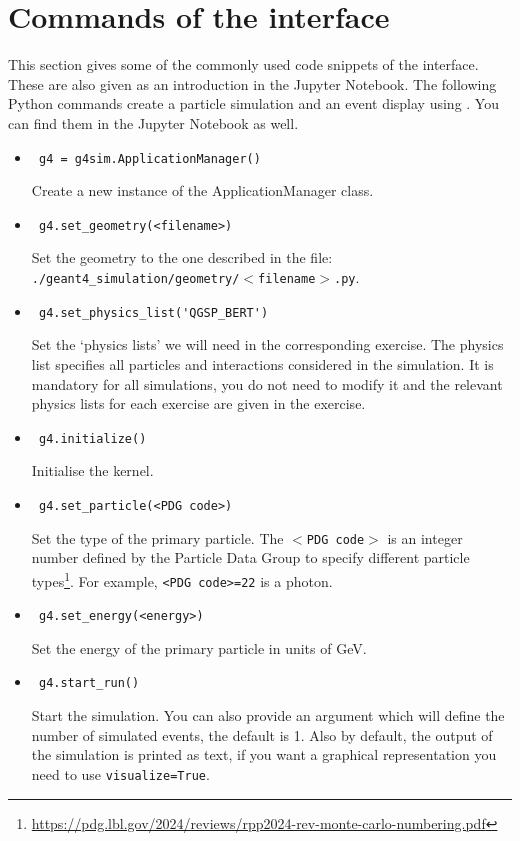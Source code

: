 \documentclass[a4paper,12pt]{article}
\begin{document}
\section*{Commands of the \geant interface}
This section gives some of the commonly used code snippets of the \geantf interface.
These are also given as an introduction in the Jupyter Notebook.
The following Python commands create a particle simulation and an event display using \geantf. You can find them in the Jupyter Notebook as well.
\begin{itemize}
\item \begin{verbatim} g4 = g4sim.ApplicationManager() \end{verbatim}
  Create a new instance of the ApplicationManager class.
\item \begin{verbatim} g4.set_geometry(<filename>) \end{verbatim}
  Set the geometry to the one described in the file:\\\texttt{./geant4\_simulation/geometry/$<$\texttt{filename}$>$.py}.
\item \begin{verbatim} g4.set_physics_list('QGSP_BERT') \end{verbatim}
  Set the `physics lists' we will need in the corresponding exercise.
  The physics list specifies all particles and interactions considered in the simulation.
  It is mandatory for all simulations, you do not need to modify it and the relevant physics lists for each exercise are given in the exercise.
\item \begin{verbatim} g4.initialize() \end{verbatim}
  Initialise the \geantf kernel.
\item \begin{verbatim} g4.set_particle(<PDG code>) \end{verbatim}
  Set the type of the primary particle. The $<$\texttt{PDG code}$>$ is an integer number defined by the Particle Data Group to specify different particle types\footnote{\url{https://pdg.lbl.gov/2024/reviews/rpp2024-rev-monte-carlo-numbering.pdf}}. For example, \texttt{<PDG code>=22} is a photon.
\item \begin{verbatim} g4.set_energy(<energy>) \end{verbatim}
  Set the energy of the primary particle in units of \si{GeV}.
\item \begin{verbatim} g4.start_run() \end{verbatim}
  Start the simulation. You can also provide an argument which will define the number of simulated events, the default is 1. Also by default, the output of the simulation is printed as text, if you want a graphical representation you need to use \texttt{visualize=True}.
\end{itemize}
\end{document}
